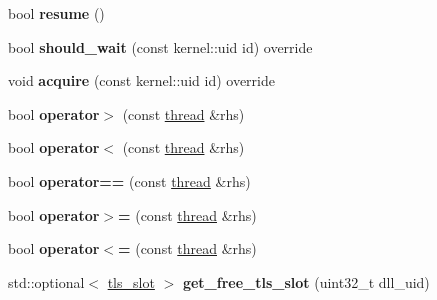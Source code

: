\begin{DoxyCompactItemize}
bool {\bfseries resume} ()
\item 
\mbox{\label{classeka2l1_1_1kernel_1_1thread_a1c74ed794226e135a93db7110e49d222}} 
bool {\bfseries should\+\_\+wait} (const kernel\+::uid id) override
\item 
\mbox{\label{classeka2l1_1_1kernel_1_1thread_aabbd6a0b12eaf91c6a0e38ede00bb191}} 
void {\bfseries acquire} (const kernel\+::uid id) override
\item 
\mbox{\label{classeka2l1_1_1kernel_1_1thread_a34ed18811f2320c73b2d0a0e87d02b44}} 
bool {\bfseries operator$>$} (const \mbox{\hyperlink{classeka2l1_1_1kernel_1_1thread}{thread}} \&rhs)
\item 
\mbox{\label{classeka2l1_1_1kernel_1_1thread_aa49553087b97f98ad402db1eb31c55d2}} 
bool {\bfseries operator$<$} (const \mbox{\hyperlink{classeka2l1_1_1kernel_1_1thread}{thread}} \&rhs)
\item 
\mbox{\label{classeka2l1_1_1kernel_1_1thread_a03c1ffe37b44210b5dd221031c8adae9}} 
bool {\bfseries operator==} (const \mbox{\hyperlink{classeka2l1_1_1kernel_1_1thread}{thread}} \&rhs)
\item 
\mbox{\label{classeka2l1_1_1kernel_1_1thread_a90f4489f2ec2fe16dc06a7ffe3d5c5fb}} 
bool {\bfseries operator$>$=} (const \mbox{\hyperlink{classeka2l1_1_1kernel_1_1thread}{thread}} \&rhs)
\item 
\mbox{\label{classeka2l1_1_1kernel_1_1thread_a7e3ef90a5dfb6dbb861964ff460a3453}} 
bool {\bfseries operator$<$=} (const \mbox{\hyperlink{classeka2l1_1_1kernel_1_1thread}{thread}} \&rhs)
\item 
\mbox{\label{classeka2l1_1_1kernel_1_1thread_a4715b46f3009b23107c1ddbbb701a6bc}} 
std\+::optional$<$ \mbox{\hyperlink{structeka2l1_1_1kernel_1_1tls__slot}{tls\+\_\+slot}} $>$ {\bfseries get\+\_\+free\+\_\+tls\+\_\+slot} (uint32\+\_\+t dll\+\_\+uid)
\item 
\mbox{\label{classeka2l1_1_1kernel_1_1thread_a4bc20af8a9f6f34b78edbe70bf63ab54}} 

\end{DoxyCompactItemize}
